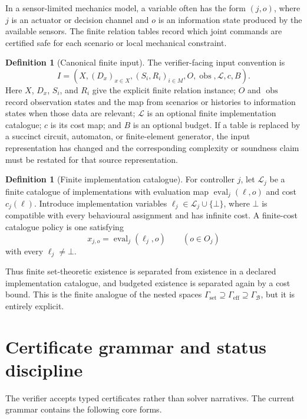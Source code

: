 \documentclass[11pt]{article}
\theoremstyle{plain}
\theoremstyle{definition}
\newtheorem{definition}[theorem]{Definition}
\theoremstyle{remark}
\newcommand{\GammaSet}{\Gamma_{\mathrm{set}}}
\newcommand{\GammaEff}{\Gamma_{\mathrm{eff}}}
\newcommand{\GammaB}{\Gamma_{\mathcal B}}
\begin{document}
In a sensor-limited mechanics model, a variable often has the form \((j,o)\),
where \(j\) is an actuator or decision channel and \(o\) is an information state
produced by the available sensors.  The finite relation tables record which
joint commands are certified safe for each scenario or local mechanical
constraint.

\begin{definition}[Canonical finite input]
The verifier-facing input convention is
\[
I=(X,(D_x)_{x\in X},(S_i,R_i)_{i\in M},O,\operatorname{obs},
\mathcal L,c,B).
\]
Here \(X\), \(D_x\), \(S_i\), and \(R_i\) give the explicit finite relation
instance; \(O\) and \(\operatorname{obs}\) record observation states and the map
from scenarios or histories to information states when those data are relevant;
\(\mathcal L\) is an optional finite implementation catalogue; \(c\) is its cost
map; and \(B\) is an optional budget.  If a table is replaced by a succinct
circuit, automaton, or finite-element generator, the input representation has
changed and the corresponding complexity or soundness claim must be restated for
that source representation.
\end{definition}

\begin{definition}[Finite implementation catalogue]
For controller \(j\), let \(\mathcal L_j\) be a finite catalogue of
implementations with evaluation map \(\operatorname{eval}_j(\ell,o)\) and cost
\(c_j(\ell)\).  Introduce implementation variables
\(\ell_j\in\mathcal L_j\cup\{\bot\}\), where \(\bot\) is compatible with every
behavioural assignment and has infinite cost.  A finite-cost catalogue policy is
one satisfying
\[
  x_{j,o}=\operatorname{eval}_j(\ell_j,o)
  \qquad(o\in O_j)
\]
with every \(\ell_j\ne\bot\).
\end{definition}

Thus finite set-theoretic existence is separated from existence in a declared
implementation catalogue, and budgeted existence is separated again by a cost
bound.  This is the finite analogue of the nested spaces
\(\GammaSet\supseteq\GammaEff\supseteq\GammaB\), but it is entirely explicit.

\section{Certificate grammar and status discipline}
\label{sec:certificates}

The verifier accepts typed certificates rather than solver narratives.  The
current grammar contains the following core forms.
\end{document}
